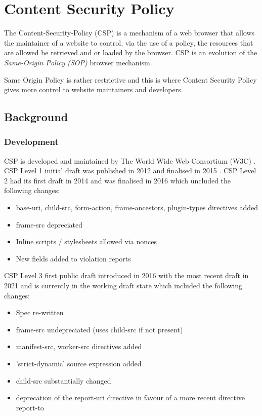 \documentclass{mscreport}
\begin{document}
\newpage

\section{Content Security Policy}
\label{section:csp}

The Content-Security-Policy (CSP) is a mechanism of a web browser that allows the maintainer of a website to control, via the use of a policy, the resources that are allowed be retrieved and or loaded by the browser. CSP is an evolution of the \textit{Same-Origin Policy (SOP)} browser mechanism.

\vspace{0.3cm} \noindent
Same Origin Policy is rather restrictive and this is where Content Security Policy gives more control to website maintainers and developers.

\subsection{Background}
\subsubsection{Development}

CSP is developed and maintained by The World Wide Web Consortium (W3C) \cite{Barth2012-ow}.
CSP Level 1 initial draft was published in 2012 \cite{Barth2012-ow} and finalised in 2015 \cite{Barth2015-ez}.
CSP Level 2 had its first draft in 2014 \cite{West2014-oe} and was finalised in 2016 \cite{West2016-ol} which uncluded the following changes:
\begin{itemize}
	\setlength\itemsep{0.1em}
	\item base-uri, child-src, form-action, frame-ancestors, plugin-types directives added
	\item frame-src depreciated
	\item Inline scripts / stylesheets allowed via nonces
	\item New fields added to violation reports
\end{itemize}

\vspace{0.3cm} \noindent
CSP Level 3 first public draft introduced in 2016 \cite{West2016-xj} with the most recent draft in 2021 \cite{West2021-hi} and is currently in the working draft state which included the following changes:
\begin{itemize}
	\setlength\itemsep{0.1em}
	\item Spec re-written
	\item frame-src undepreciated (uses child-src if not present)
	\item manifest-src, worker-src directives added
	\item 'strict-dynamic' source expression added
	\item child-src substantially changed
	\item deprecation of the report-uri directive in favour of a more recent directive report-to
\end{itemize}
\end{document}
